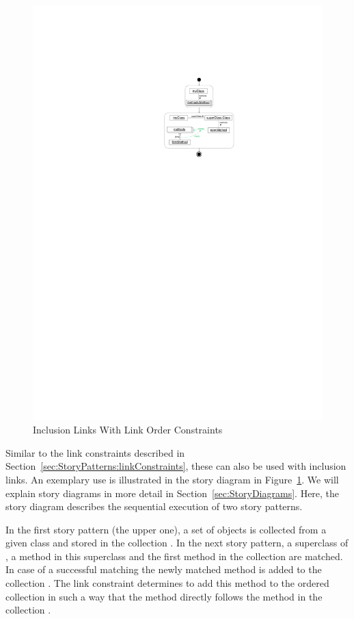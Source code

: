 \begin{figure}[htb]
  \centering
  \includegraphics[scale=.8]{figures/LinkConstraints1}
  \caption{Inclusion Links With Link Order Constraints}
  \label{fig:collectionsLinkConstraints}
\end{figure}

Similar to the link constraints described in Section~\ref{sec:StoryPatterns:linkConstraints}, these can also be used with inclusion links.
An exemplary use is illustrated in the story diagram in Figure~\ref{fig:collectionsLinkConstraints}.
We will explain story diagrams in more detail in Section~\ref{sec:StoryDiagrams}.
Here, the story diagram describes the sequential execution of two story patterns.

In the first story pattern (the upper one), a set of  objects is collected from a given class  and stored in the collection .
In the next story pattern, a superclass of , a method in this superclass and the first method in the collection  are matched.
In case of a successful matching the newly matched method  is added to the collection .
The link constraint  determines to add this method to the ordered collection in such a way
that the method  directly follows the method  in the collection .



